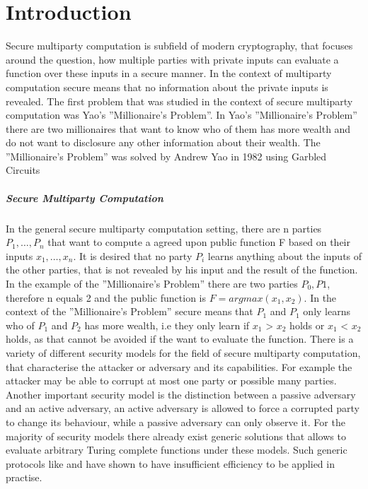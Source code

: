 \chapter {Introduction}
Secure multiparty computation is subfield of modern cryptography, that focuses around the question, how multiple parties with private inputs can evaluate a function over these inputs in a secure manner. In the context of multiparty computation secure means that no information about the private inputs is revealed. The first problem that was studied in the context of secure multiparty computation was Yao's ''Millionaire’s Problem''. In Yao's ''Millionaire’s Problem'' there are two millionaires that want to know who of them has more wealth and do not want to disclosure any other information about their wealth. The ''Millionaire’s Problem'' was solved by Andrew Yao in 1982 \cite{4568388} using Garbled Circuits
\paragraph{Secure Multiparty Computation}
In the general secure multiparty computation setting, there are n parties $ P_1,\dots,P_{n} $ that want to compute a agreed upon public function F based on their inputs $ x_1,\dots,x_{n}$. It is desired that no party $P_i$ learns anything about the inputs of the other parties, that is not revealed by his input and the result of the function. In the example of the ''Millionaire’s Problem'' there are two parties $P_0,P1 $, therefore n equals 2 and the public function is $F=argmax(x_1,x_2)$. In the context of the ''Millionaire’s Problem'' secure means that $P_1$ and $P_1$ only learns who of $P_1$ and $P_2$ has more wealth, i.e they only learn if $x_1$ > $x_2$ holds or $x_1$ < $x_2$ holds, as that cannot be avoided if the want to evaluate the function. 
There is a variety of different security models for the field of secure multiparty computation, that characterise the attacker or adversary and its capabilities. For example the attacker may be able to corrupt at most one party or possible many parties. Another important security model is the distinction between a passive adversary and an active adversary, an active adversary is allowed to force a corrupted party to change its behaviour, while a passive adversary can only observe it. 
For the majority of security models there already exist generic solutions that allows to evaluate arbitrary Turing complete functions under these models. Such generic protocols like \cite{DBLP:conf/crypto/WigdersonD82} and \cite{4568388} have shown to have insufficient efficiency to be applied in practise. 
\cite{hastings2019sok} \cite{Archer2018FromKT}










